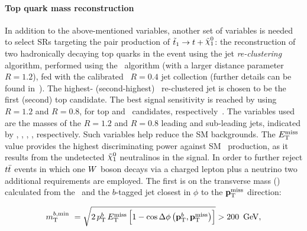 			\paragraph*{Top quark mass reconstruction}

				In addition to the above-mentioned variables, another set of variables is needed to select \acp{SR} targeting the pair production of $\stopone \to t + \ninoone$: the reconstruction of two hadronically decaying top quarks in the event using the jet \emph{re-clustering} algorithm, performed using the \antikt\ algorithm (with a larger distance parameter $R = 1.2$), fed with the calibrated \antikt\ $R = 0.4$ jet collection (further details can be found in~\cite{Antikt2008}). The highest- (second-highest) \pt\ re-clustered jet is chosen to be the first (second) top candidate. The best signal sensitivity is reached by using $R = 1.2$ and $R = 0.8$, for top and \Wboson\ candidates, respectively~\cite{stop0L,ICHEPstop0L}. The variables used are the masses of the $R=1.2$ and $R=0.8$ leading and sub-leading jets, indicated by \mantikttwelvezero, \mantikttwelveone, \mantikteightzero, \mantikteightone, respectively. Such variables help reduce the \ac{SM} backgrounds. %
				The $E_{\mathrm{T}}^{\mathrm{miss}}$ value provides the highest discriminating power against \ac{SM} \ttbar\ production, as it results from the undetected $\ninoone$ neutralinos in the signal. In order to further reject $t\bar{t}$ events in which one $W$ boson decays via a charged lepton plus a neutrino two additional requirements are employed. The first is on the transverse mass (\mt) calculated from the \met\ and the $b$-tagged jet closest in $\phi$ to the $\mathbf{p}_\mathrm{T}^\mathrm{miss}$ direction: 

				\begin{equation*}
					\mtbmin\ = \sqrt{2\,\ptb\,\met \left[1-\cos{\Delta\phi\left(\vecptb,\ptmiss\right)}\right]} > 200\,\GeV,
				\end{equation*}


